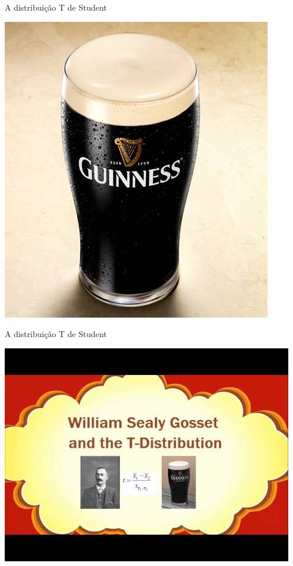 \documentclass{beamer}
\begin{document}
\begin{frame}{A distribuição T de Student}
  \begin{center}
    \includegraphics[height=\textheight]{Cap5/Guinness}
  \end{center}
\end{frame}

\begin{frame}{A distribuição T de Student}
  \begin{center}
    \includegraphics[height=\textheight]{Cap5/Student-Guinness}
  \end{center}
\end{frame}
\end{document}
